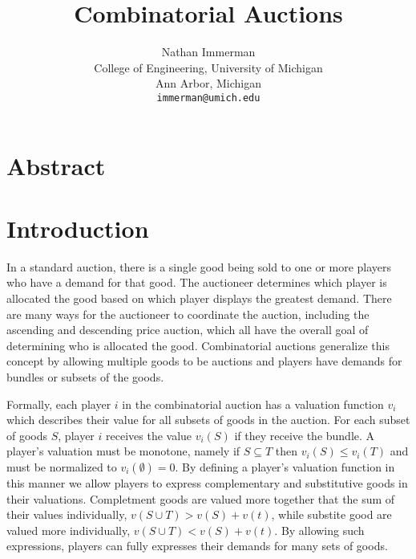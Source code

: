 \documentclass[10pt,onecolumn,letterpaper]{article}
\begin{document}
\title{Combinatorial Auctions}

\author{Nathan Immerman\\
College of Engineering, University of Michigan\\
Ann Arbor, Michigan\\
{\tt\small immerman@umich.edu}
}

\maketitle


\section{Abstract}

\section{Introduction}

In a standard auction, there is a single good being sold to one or more players who have a demand for that good. The auctioneer determines which player is allocated the good based on which player displays the greatest demand. There are many ways for the auctioneer to coordinate the auction, including the ascending and descending price auction, which all have the overall goal of determining who is allocated the good. Combinatorial auctions generalize this concept by allowing multiple goods to be auctions and players have demands for bundles or subsets of the goods. 

Formally, each player $i$ in the combinatorial auction has a valuation function $v_i$ which describes their value for all subsets of goods in the auction. For each subset of goods $S$, player $i$ receives the value $v_i(S)$ if they receive the bundle. A player's valuation must be monotone, namely if $S \subseteq T$ then $v_i(S) \leq v_i(T)$ and must be normalized to $v_i(\emptyset)= 0$. By defining a player's valuation function in this manner we allow players to express complementary and substitutive goods in their valuations. Completment goods are valued more together that the sum of their values individually, $v(S \cup T) > v(S) + v(t)$, while substite good are valued more individually, $v(S \cup T) < v(S) + v(t)$. By allowing such expressions, players can fully expresses their demands for many sets of goods.
\end{document}

